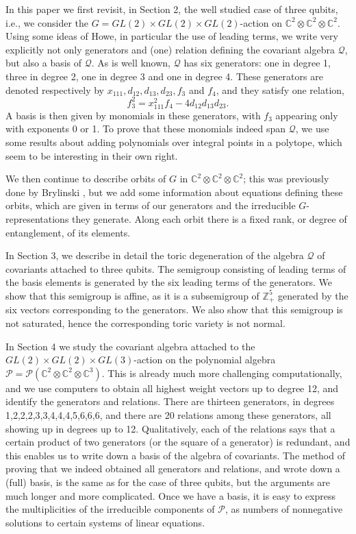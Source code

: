 \documentclass[reqno,11pt]{amsart}
\theoremstyle{remark}
\theoremstyle{definition}
\numberwithin{equation}{section}
\newcommand{\cal}{\mathcal}
\newcommand{\bbC}{\mathbb{C}}
\newcommand{\bbZ}{\mathbb{Z}}
\begin{document}
In this paper we first revisit, in Section 2, the well studied case of three qubits, i.e., we consider the $G=GL(2)\times GL(2)\times GL(2)$-action on $\bbC^2\otimes\bbC^2\otimes \bbC^2$. Using some ideas of Howe, in particular the use of leading terms, we write very explicitly not only generators and (one) relation defining the covariant algebra $\cal Q$, but also a basis of $\cal Q$. 
As is well known, $\cal Q$ has six generators: one in degree 1, three in degree 2, one in degree 3 and one in degree 4. These generators are denoted respectively by $x_{111},d_{12},d_{13},d_{23},f_3$ and $f_4$, and
they satisfy one relation,
\[
f_3^2=x_{111}^2f_4 -  4d_{12}d_{13}d_{23}.
\]
A basis is then given by monomials in these generators, with $f_3$ appearing only with exponents 0 or 1. 
To prove that these monomials indeed span $\cal Q$, we use some results about adding polynomials over integral points in a polytope, which seem to be interesting in their own right.

We then continue to describe orbits of $G$ in $\bbC^2\otimes\bbC^2\otimes \bbC^2$; this was previously done by Brylinski \cite{B}, but we add some information about equations defining these orbits, which are given in terms of our generators and the irreducible $G$-representations they generate. Along each orbit there is a fixed rank, or degree of entanglement, of its elements. 

In Section 3, we describe in detail the toric degeneration of the algebra $\cal Q$ of covariants attached to three qubits. The semigroup consisting of leading terms of the basis elements is generated by the six leading terms of the generators. We show that this semigroup is affine, as it is a subsemigroup of $\bbZ_+^5$ generated by the six vectors corresponding to the generators. We also show that this semigroup is not saturated, 
hence the corresponding toric variety is not normal.

In Section 4 we study the covariant algebra attached to the $GL(2)\times GL(2)\times GL(3)$-action on the polynomial algebra $\cal P=\cal P(\bbC^2\otimes\bbC^2\otimes \bbC^3)$. This is already much more challenging computationally, and we use computers to obtain all highest weight vectors up to degree 12, and identify the generators and relations. There are thirteen generators, in degrees 1,2,2,2,3,3,4,4,4,5,6,6,6, and there are 20 relations among these generators, all showing up in degrees up to 12. Qualitatively, each of the relations says that a certain product of two generators (or the square of a generator) is redundant, and this enables us to write down a basis of the algebra of covariants. The method of proving that we indeed obtained all generators and relations, and wrote down a (full) basis, is the same as for the case of three qubits, but the arguments are much longer and more complicated. Once we have a basis, it is easy to express the multiplicities of the irreducible components of $\cal P$, as numbers of nonnegative solutions to certain systems of linear equations.
\end{document}

